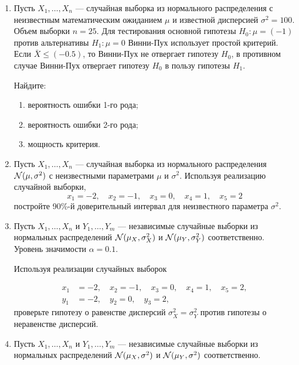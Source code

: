 \begin{enumerate}

\item Пусть $X_{1}, \ldots, X_{n}$ — случайная выборка из нормального распределения с неизвестным математическим ожиданием $\mu$ и известной дисперсией $\sigma^2=100$. Объем выборки $n=25$. Для тестирования основной гипотезы $H_{0}:\mu=(-1)$ против альтернативы $H_{1}:\mu=0$ Винни-Пух использует простой критерий. Если $\bar X \leq (-0.5)$, то Винни-Пух не отвергает гипотезу $H_{0}$, в противном случае Винни-Пух отвергает гипотезу $H_{0}$ в пользу гипотезы $H_{1}$. 

Найдите:

\begin{enumerate}
    \item вероятность ошибки 1-го рода;
    \item вероятность ошибки 2-го рода;
    \item мощность критерия.
\end{enumerate}

\item Пусть $X_{1}, \ldots, X_{n}$ — случайная выборка из нормального распределения $\mathcal{N}(\mu, \sigma^2)$ с неизвестными параметрами $\mu$ и ${\sigma}^2$.
Используя реализацию случайной выборки,
\[
x_{1} = -2, \quad x_{2} = -1, \quad x_{3} = 0, \quad x_{4} = 1, \quad x_{5} = 2
\]
постройте 90\%-й доверительный интервал для неизвестного параметра $\sigma^2$.

\item Пусть $X_{1}, \ldots, X_{n}$ и $Y_{1}, \ldots, Y_{m}$ — независимые случайные
выборки из нормальных распределений $\mathcal{N}(\mu_{X},\sigma^2_{X})$ и
$\mathcal{N}(\mu_{Y},\sigma^2_{Y})$ соответственно.
Уровень значимости $\alpha = 0.1$.

Используя реализации случайных выборок

\begin{align*}
x_{1} &= -2, \quad x_{2} = -1, \quad x_{3} = 0, \quad x_{4} = 1, \quad x_{5} = 2, \\
y_{1} &= -2, \quad y_{2} = 0, \quad y_{3} = 2,
\end{align*}
проверьте гипотезу о равенстве дисперсий $\sigma^2_X = \sigma^2_Y$ против гипотезы о неравенстве дисперсий.

\item Пусть $X_{1}, \ldots, X_{n}$ и $Y_{1}, \ldots, Y_{m}$ —
независимые случайные выборки из нормальных распределений 
$\mathcal{N}(\mu_{X},\sigma^2)$ и $\mathcal{N}(\mu_{Y},\sigma^2)$ соответственно.


\end{enumerate}
